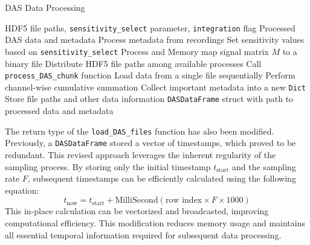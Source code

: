 \begin{algorithm}[!h]
\caption{DAS Data Processing}
\begin{algorithmic}[1]
\Require HDF5 file paths, \texttt{sensitivity\_select} parameter, \texttt{integration} flag
\Ensure Processed DAS data and metadata
\State Process metadata from recordings
\State Set sensitivity values based on \texttt{sensitivity\_select}
    \State Process and Memory map  signal matrix $M$ to a binary file
\Else
        \State Distribute HDF5 file paths among available processes
            \State Call \texttt{process\_DAS\_chunk} function
        \EndFor
    \Else 
            \State Load data from a single file sequentially
        \EndFor
    \EndIf
\EndIf
{}
    \State Perform channel-wise cumulative summation
\EndIf
\State Collect important metadata into a new \texttt{Dict}
\State Store file paths and other data information
\State \Return \texttt{DASDataFrame} struct with path to processed data and metadata
\end{algorithmic}
\label{alg:loaddas}
\end{algorithm}
The return type of the \texttt{load\_DAS\_files} function has also been modified. Previously, a \texttt{DASDataFrame} stored a vector of timestamps, which proved to be redundant. This revised approach leverages the inherent regularity of the sampling process. By storing only the initial timestamp $t_{\text{start}}$ and the sampling rate $F$, subsequent timestamps can be efficiently calculated using the following equation:
\begin{equation}
    t_{\text{now}} = t_{\text{start}} + \text{MilliSecond}(\text{row index} \times F \times 1000)
\end{equation}
%
This in-place calculation can be vectorized and broadcasted, improving computational efficiency. This modification reduces memory usage and maintains all essential temporal information required for subsequent data processing. 
\clearpage


